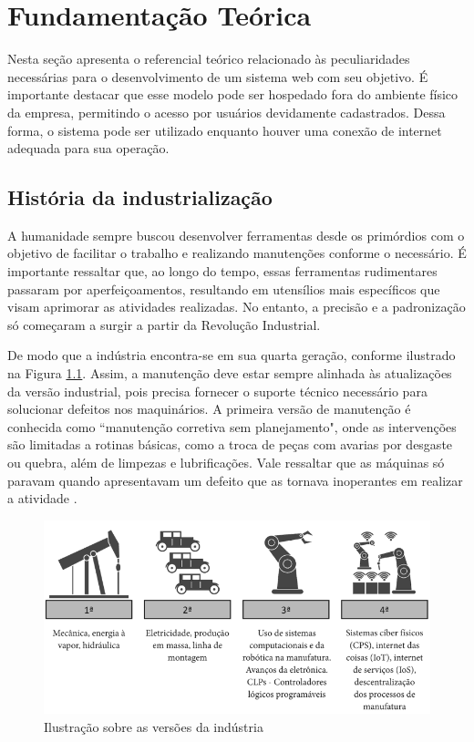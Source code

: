 \chapter{Fundamentação Teórica}
\label{cha:fundamentacao}

Nesta seção apresenta o referencial teórico relacionado às peculiaridades necessárias para o desenvolvimento de um sistema web com seu objetivo. É importante destacar que esse modelo pode ser hospedado fora do ambiente físico da empresa, permitindo o acesso por usuários devidamente cadastrados. Dessa forma, o sistema pode ser utilizado enquanto houver uma conexão de internet adequada para sua operação.

\section{História da industrialização}
\label{sec:hist_industria}

A humanidade sempre buscou desenvolver ferramentas desde os primórdios com o objetivo de facilitar o trabalho e realizando manutenções conforme o necessário. É importante ressaltar que, ao longo do tempo, essas ferramentas rudimentares passaram por aperfeiçoamentos, resultando em utensílios mais específicos que visam aprimorar as atividades realizadas. No entanto, a precisão e a padronização só começaram a surgir a partir da Revolução Industrial.

De modo que a indústria encontra-se em sua quarta geração, conforme ilustrado na Figura \ref{fig:etapas_industria}. Assim, a manutenção deve estar sempre alinhada às atualizações da versão industrial, pois precisa fornecer o suporte técnico necessário para solucionar defeitos nos maquinários. A primeira versão de manutenção é conhecida como ``manutenção corretiva sem planejamento", onde as intervenções são limitadas a rotinas básicas, como a troca de peças com avarias por desgaste ou quebra, além de limpezas e lubrificações. Vale ressaltar que as máquinas só paravam quando apresentavam um defeito que as tornava inoperantes em realizar a atividade \mbox{\cite{a:manutencao_industriav4_2023}.}

\begin{figure}[th!]
    \centering
    \includegraphics[width=0.75\linewidth]{figs/industria_as_4_versoes.png}
    \caption{Ilustração sobre as versões da indústria \cite{b:industria_v4_2018}}
    \label{fig:etapas_industria}
\end{figure}

